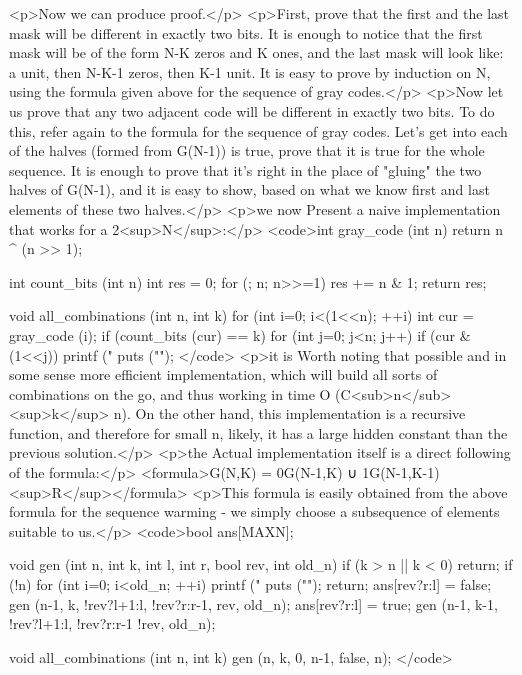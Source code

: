 <p>Now we can produce proof.</p>
<p>First, prove that the first and the last mask will be different in exactly two bits. It is enough to notice that the first mask will be of the form N-K zeros and K ones, and the last mask will look like: a unit, then N-K-1 zeros, then K-1 unit. It is easy to prove by induction on N, using the formula given above for the sequence of gray codes.</p>
<p>Now let us prove that any two adjacent code will be different in exactly two bits. To do this, refer again to the formula for the sequence of gray codes. Let's get into each of the halves (formed from G(N-1)) is true, prove that it is true for the whole sequence. It is enough to prove that it's right in the place of "gluing" the two halves of G(N-1), and it is easy to show, based on what we know first and last elements of these two halves.</p>
<p>we now Present a naive implementation that works for a 2<sup>N</sup>:</p>
<code>int gray_code (int n) {
return n ^ (n >> 1);
}

int count_bits (int n) {
int res = 0;
for (; n; n>>=1)
res += n & 1;
return res;
}

void all_combinations (int n, int k) {
for (int i=0; i<(1<<n); ++i) {
int cur = gray_code (i);
if (count_bits (cur) == k) {
for (int j=0; j<n; j++)
if (cur & (1<<j))
printf ("%
puts ("");
}
}
}</code>
<p>it is Worth noting that possible and in some sense more efficient implementation, which will build all sorts of combinations on the go, and thus working in time O (C<sub>n</sub><sup>k</sup> n). On the other hand, this implementation is a recursive function, and therefore for small n, likely, it has a large hidden constant than the previous solution.</p>
<p>the Actual implementation itself is a direct following of the formula:</p>
<formula>G(N,K) = 0G(N-1,K) ∪ 1G(N-1,K-1)<sup>R</sup></formula>
<p>This formula is easily obtained from the above formula for the sequence warming - we simply choose a subsequence of elements suitable to us.</p>
<code>bool ans[MAXN];

void gen (int n, int k, int l, int r, bool rev, int old_n) {
if (k > n || k < 0) return;
if (!n) {
for (int i=0; i<old_n; ++i)
printf ("%
puts ("");
return;
}
ans[rev?r:l] = false;
gen (n-1, k, !rev?l+1:l, !rev?r:r-1, rev, old_n);
ans[rev?r:l] = true;
gen (n-1, k-1, !rev?l+1:l, !rev?r:r-1 !rev, old_n);
}

void all_combinations (int n, int k) {
gen (n, k, 0, n-1, false, n);
}</code>